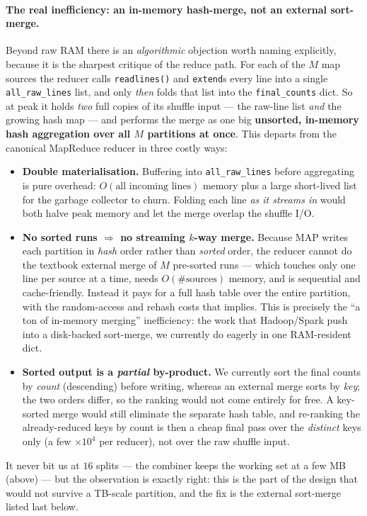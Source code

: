\documentclass[11pt,a4paper]{article}
\newcommand{\code}[1]{\texttt{\small #1}}
\begin{document}
\paragraph{The real inefficiency: an in-memory hash-merge, not an external
sort-merge.} Beyond raw RAM there is an \emph{algorithmic} objection worth naming
explicitly, because it is the sharpest critique of the reduce path. For each of
the $M$ map sources the reducer calls \code{readlines()} and \code{extend}s every
line into a single \code{all\_raw\_lines} list, and only \emph{then} folds that
list into the \code{final\_counts} dict. So at peak it holds \emph{two} full
copies of its shuffle input --- the raw-line list \emph{and} the growing hash map
--- and performs the merge as one big \textbf{unsorted, in-memory hash
aggregation over all $M$ partitions at once}. This departs from the canonical
MapReduce reducer in three costly ways:
\begin{itemize}[leftmargin=1.4em]
  \item \textbf{Double materialisation.} Buffering into \code{all\_raw\_lines}
  before aggregating is pure overhead: $O(\text{all incoming lines})$ memory plus
  a large short-lived list for the garbage collector to churn. Folding each line
  \emph{as it streams in} would both halve peak memory and let the merge overlap
  the shuffle I/O.
  \item \textbf{No sorted runs $\Rightarrow$ no streaming $k$-way merge.} Because
  MAP writes each partition in \emph{hash} order rather than \emph{sorted} order,
  the reducer cannot do the textbook external merge of $M$ pre-sorted runs ---
  which touches only one line per source at a time, needs $O(\#\text{sources})$
  memory, and is sequential and cache-friendly. Instead it pays for a full hash
  table over the entire partition, with the random-access and rehash costs that
  implies. This is precisely the ``a ton of in-memory merging'' inefficiency: the
  work that Hadoop/Spark push into a disk-backed sort-merge, we currently do
  eagerly in one RAM-resident dict.
  \item \textbf{Sorted output is a \emph{partial} by-product.} We currently sort
  the final counts by \emph{count} (descending) before writing, whereas an
  external merge sorts by \emph{key}; the two orders differ, so the ranking would
  not come entirely for free. A key-sorted merge would still eliminate the
  separate hash table, and re-ranking the already-reduced keys by count is then a
  cheap final pass over the \emph{distinct} keys only (a few $\times10^4$ per
  reducer), not over the raw shuffle input.
\end{itemize}
It never bit us at $16$ splits --- the combiner keeps the working set at a few MB
(above) --- but the observation is exactly right: this is the part of the design
that would not survive a TB-scale partition, and the fix is the external
sort-merge listed last below.
\end{document}

